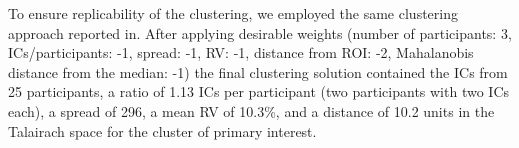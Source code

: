 To ensure replicability of the clustering, we employed the same clustering approach reported in\cite{cleaning_FH2018}. After applying desirable weights (number of participants: 3, ICs/participants: -1, spread: -1, RV: -1, distance from ROI: -2, Mahalanobis distance from the median: -1) the final clustering solution contained the ICs from 25 participants, a ratio of 1.13 ICs per participant (two participants with two ICs each), a spread of 296, a mean RV of 10.3\%, and a distance of 10.2 units in the Talairach space for the cluster of primary interest.